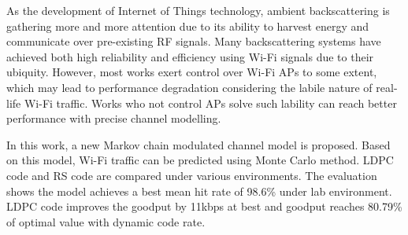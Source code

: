 \begin{enabstract}
%
As the development of Internet of Things technology, ambient backscattering is gathering more and
more attention due to its ability to harvest energy and communicate over pre-existing RF signals.
Many backscattering systems have achieved both high reliability and efficiency using Wi-Fi signals due to 
their ubiquity. However, most works exert control over Wi-Fi APs to some extent, which may lead to performance 
degradation considering the labile nature of real-life Wi-Fi traffic. Works who not control APs solve such lability can 
reach better performance with precise channel modelling.

In this work, a new Markov chain modulated channel model is proposed. Based on this model, Wi-Fi traffic can be predicted using Monte Carlo method. LDPC code and RS code are compared under various environments. The evaluation shows the model achieves a best mean hit rate of 98.6\% under lab environment. LDPC code improves the goodput by 11kbps at best and  goodput reaches 80.79\% of optimal value with dynamic code rate.
\end{enabstract}
